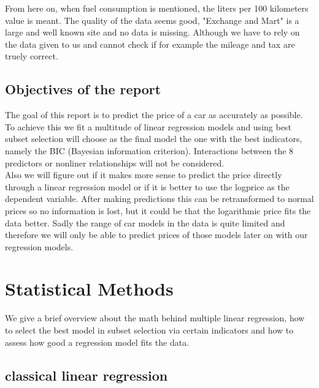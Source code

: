 \documentclass[12 pt]{scrartcl}
\begin{document}
From here on, when fuel consumption is mentioned, the liters per 100 kilometers value is meant.
The quality of the data seems good, "Exchange and Mart" is a large and well known site and no data is missing. Although we have to rely on the data given to us and cannot check if for example the mileage and tax are truely correct.

\subsection{Objectives of the report}
The goal of this report is to predict the price of a car as accurately as possible. To achieve this we fit a multitude of linear regression models and using best subset selection will choose as the final model the one with the best indicators, namely the BIC (Bayesian information criterion). Interactions between the 8 predictors or nonliner relationships will not be considered. \\
Also we will figure out if it makes more sense to predict the price directly through a linear regression model or if it is better to use the logprice as the dependent variable. After making predictions this can be retransformed to normal prices so no information is lost, but it could be that the logarithmic price fits the data better.
Sadly the range of car models in the data is quite limited and therefore we will only be able to predict prices of those models later on with our regression models.

\section{Statistical Methods}

We give a brief overview about the math behind multiple linear regression, how to select the best model in subset selection via certain indicators and how to assess how good a regression model fits the data.

\subsection{classical linear regression}
\end{document}
